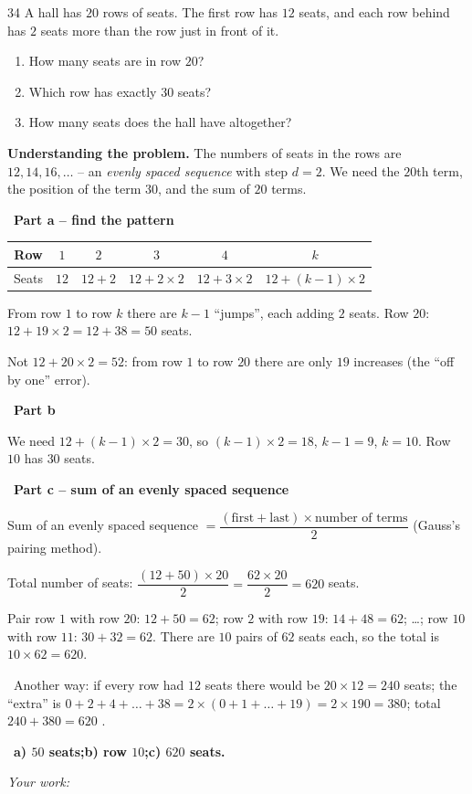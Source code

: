 \documentclass[11pt]{article}
\newif\ifsol \solfalse
\providecommand{\AnsWord}{Đáp số}
\newcommand{\ans}[1]{\par\smallskip{\bfseries\color{tmGreen!88!black}\AnsWord:}\ {\bfseries\color{AnsRed}#1}\par}
\newcommand{\probsol}[1]{%
  \begin{lrbox}{\solmeasure}\begin{minipage}{\dimexpr\linewidth-24pt\relax}#1\end{minipage}\end{lrbox}%
  \ifsol
    \begin{solbox}#1\end{solbox}%
  \else
    \setlength{\solht}{\dimexpr\ht\solmeasure+\dp\solmeasure+0.85cm\relax}%
    \ifdim\solht<1.35cm\setlength{\solht}{1.35cm}\fi
    \ifdim\solht>\StudentMaxWork\setlength{\solht}{\StudentMaxWork}\fi
    \begin{tcolorbox}[colback=white,colframe=Line,boxrule=0.8pt,arc=5pt,
      left=8pt,right=8pt,top=4pt,bottom=4pt,height=\solht]{\footnotesize\color{Slate}\itshape\WorkWord}\end{tcolorbox}%
  \fi}
\newlength{\StudentMaxWork}\setlength{\StudentMaxWork}{7.5cm}
\newcommand{\step}[2]{\par\smallskip\noindent{\bfseries\color{tmBlue!85!black}\StepWord~#1.}\ {\bfseries #2}\par\nopagebreak}
\newcommand{\verify}[1]{\par\smallskip\noindent{\bfseries\color{tmGreen!80!black}\faCheckCircle\ \CheckWord}\ #1\par}
\def\WorkWord{Your work:}
\def\AnsWord{Answer}
\def\StepWord{Step}
\def\CheckWord{Check:}
\begin{document}
\begin{probbox}{34}{\relax}
A hall has $20$ rows of seats. The first row has $12$ seats, and each row behind has $2$ seats more than the row just in front of it.
\begin{enumerate}[label=\alph*),leftmargin=1.5em,itemsep=0pt,topsep=2pt]
\item How many seats are in row $20$?
\item Which row has exactly $30$ seats?
\item How many seats does the hall have altogether?
\end{enumerate}
\end{probbox}
\probsol{
\textbf{Understanding the problem.} The numbers of seats in the rows are $12,14,16,\dots$ -- an \emph{evenly spaced sequence} with step $d=2$. We need the $20$th term, the position of the term $30$, and the sum of $20$ terms.
\step{1}{Part a -- find the pattern}
\begin{center}
\begin{tabular}{|c|c|c|c|c|c|}\hline
Row & $1$ & $2$ & $3$ & $4$ & $k$\\ \hline
Seats & $12$ & $12+2$ & $12+2\times2$ & $12+3\times2$ & $12+(k-1)\times2$\\ \hline
\end{tabular}
\end{center}
From row $1$ to row $k$ there are $k-1$ ``jumps'', each adding $2$ seats. Row $20$: $12+19\times2=12+38=50$ seats.
\begin{warnbox}Not $12+20\times2=52$: from row $1$ to row $20$ there are only $19$ increases (the ``off by one'' error).\end{warnbox}
\step{2}{Part b}
We need $12+(k-1)\times2=30$, so $(k-1)\times2=18$, $k-1=9$, $k=10$. Row $10$ has $30$ seats.
\step{3}{Part c -- sum of an evenly spaced sequence}
\begin{recallbox}Sum of an evenly spaced sequence $=\dfrac{(\text{first}+\text{last})\times\text{number of terms}}{2}$ (Gauss's pairing method).\end{recallbox}
Total number of seats: $\dfrac{(12+50)\times20}{2}=\dfrac{62\times20}{2}=620$ seats.
\begin{proofbox}Pair row $1$ with row $20$: $12+50=62$; row $2$ with row $19$: $14+48=62$; \ldots; row $10$ with row $11$: $30+32=62$. There are $10$ pairs of $62$ seats each, so the total is $10\times62=620$.\end{proofbox}
\verify{Another way: if every row had $12$ seats there would be $20\times12=240$ seats; the ``extra'' is $0+2+4+\dots+38=2\times(0+1+\dots+19)=2\times190=380$; total $240+380=620$ \checkmark.}
\ans{a) $50$ seats;\quad b) row $10$;\quad c) $620$ seats.}
}
\end{document}
